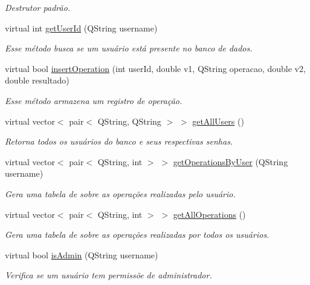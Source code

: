 \begin{DoxyCompactItemize}
\begin{DoxyCompactList}\small\item\em Destrutor padrão. \end{DoxyCompactList}\item 
virtual int \hyperlink{classDatabaseHelperImpl_a071ca71dc50d21a3d5749156aec99476}{get\+User\+Id} (Q\+String username)
\begin{DoxyCompactList}\small\item\em Esse método busca se um usuário está presente no banco de dados. \end{DoxyCompactList}\item 
virtual bool \hyperlink{classDatabaseHelperImpl_a4791d584b178b71a186a843dbc8ab86e}{insert\+Operation} (int user\+Id, double v1, Q\+String operacao, double v2, double resultado)
\begin{DoxyCompactList}\small\item\em Esse método armazena um registro de operação. \end{DoxyCompactList}\item 
virtual vector$<$ pair$<$ Q\+String, Q\+String $>$ $>$ \hyperlink{classDatabaseHelperImpl_ac93f23c05d794595149585c451f24605}{get\+All\+Users} ()
\begin{DoxyCompactList}\small\item\em Retorna todos os usuários do banco e seus respectivas senhas. \end{DoxyCompactList}\item 
virtual vector$<$ pair$<$ Q\+String, int $>$ $>$ \hyperlink{classDatabaseHelperImpl_a124bd600c3e2daa19dc24982eb3dea14}{get\+Operations\+By\+User} (Q\+String username)
\begin{DoxyCompactList}\small\item\em Gera uma tabela de sobre as operações realizadas pelo usuário. \end{DoxyCompactList}\item 
virtual vector$<$ pair$<$ Q\+String, int $>$ $>$ \hyperlink{classDatabaseHelperImpl_aedd37d515fad4f0b0884748bf77f677c}{get\+All\+Operations} ()
\begin{DoxyCompactList}\small\item\em Gera uma tabela de sobre as operações realizadas por todos os usuários. \end{DoxyCompactList}\item 
virtual bool \hyperlink{classDatabaseHelperImpl_a3c6da9438b26955fcef6a080c85652f5}{is\+Admin} (Q\+String username)
\begin{DoxyCompactList}\small\item\em Verifica se um usuário tem permissõe de administrador. \end{DoxyCompactList}\end{DoxyCompactItemize}
